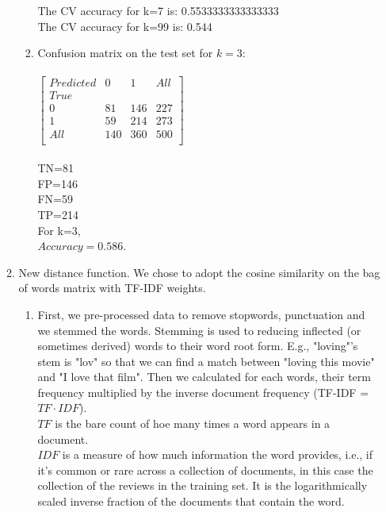 \documentclass[12pt]{article}
\begin{document}
\begin{enumerate}
\begin{enumerate}
\begin{enumerate}
 		The CV accuracy for k=7 is:  0.5533333333333333\\
 		
		The CV accuracy for k=99 is:  0.544
		
		\item Confusion matrix on the test set for $k=3$:\\\\
		$\left[ \begin{array}{cccc}
		Predicted  & 0 & 1 & All \\
		True & & & \\
		0 & 81 & 146 & 227 \\
		1 & 59 & 214 & 273 \\
		All & 140 & 360 & 500 \\		
		\end{array} \right]$\\\\
		TN=81\\FP=146\\FN=59\\TP=214\\
		
		For k=3,\\
		$Accuracy=0.586$.\\
	 
	 	\end{enumerate}
	 
	 \item New distance function. We chose to adopt the cosine similarity on the bag of words matrix with TF-IDF weights.
	 
	 \begin{enumerate}
	 \item First, we pre-processed data to remove stopwords, punctuation and we stemmed the words. Stemming is used to reducing inflected (or sometimes derived) words to their word root form. E.g., "loving"'s stem is "lov" so that we can find a match between "loving this movie" and "I love that film". Then we calculated for each words, their term frequency multiplied by the inverse document frequency (TF-IDF = $TF\cdot IDF$).\\
	 
	 $TF$ is the bare count of hoe many times a word appears in a document.\\
	 
	 $IDF$ is a measure of how much information the word provides, i.e., if it's common or rare across a collection of documents, in this case the collection of the reviews in the training set. It is the logarithmically scaled inverse fraction of the documents that contain the word. \\
	 

\end{enumerate}
\end{enumerate}
\end{enumerate}
\end{document}
